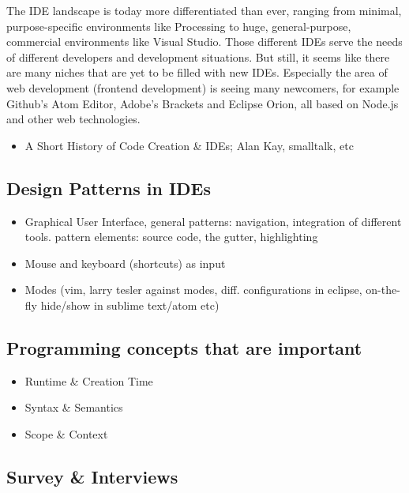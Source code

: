 The IDE landscape is today more differentiated than ever, ranging from
minimal, purpose-specific environments like Processing to huge,
general-purpose, commercial environments like Visual Studio. Those
different IDEs serve the needs of different developers and development
situations. But still, it seems like there are many niches that are yet
to be filled with new IDEs. Especially the area of web development
(frontend development) is seeing many newcomers, for example Github’s
Atom Editor, Adobe’s Brackets and Eclipse Orion, all based on Node.js
and other web technologies.

\begin{itemize}
\itemsep1pt\parskip0pt
\item
  A Short History of Code Creation \& IDEs; Alan Kay, smalltalk, etc
\end{itemize}

\subsection{Design Patterns in IDEs}\label{design-patterns-in-ides}

\begin{itemize}
\itemsep1pt\parskip0pt
\item
  Graphical User Interface, general patterns: navigation, integration of
  different tools. pattern elements: source code, the gutter,
  highlighting
\item
  Mouse and keyboard (shortcuts) as input
\item
  Modes (vim, larry tesler against modes, diff. configurations in
  eclipse, on-the-fly hide/show in sublime text/atom etc)
\end{itemize}

\subsection{Programming concepts that are
important}\label{programming-concepts-that-are-important}

\begin{itemize}
\itemsep1pt\parskip0pt
\item
  Runtime \& Creation Time
\item
  Syntax \& Semantics
\item
  Scope \& Context
\end{itemize}

\subsection{Survey \& Interviews}\label{survey-interviews}

